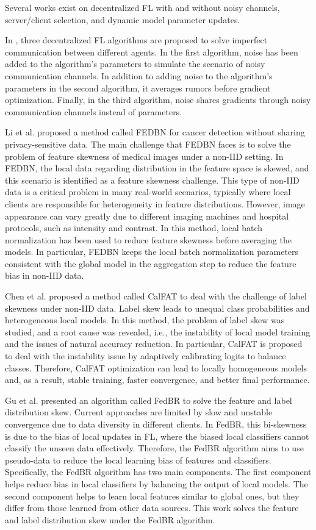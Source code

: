 Several works exist on decentralized FL with and without noisy channels, server/client selection, and dynamic model parameter updates. 

In \citep{ref35}, three decentralized FL algorithms are proposed to solve imperfect communication between different agents. In the first algorithm, noise has been added to the algorithm's parameters to simulate the scenario of noisy communication channels. In addition to adding noise to the algorithm's parameters in the second algorithm, it averages rumors before gradient optimization. Finally, in the third algorithm, noise shares gradients through noisy communication channels instead of parameters. 

Li et al. \citep{ref61} proposed a method called FEDBN for cancer detection without sharing privacy-sensitive data. The main challenge that FEDBN faces is to solve the problem of feature skewness of medical images under a non-IID setting. In FEDBN, the local data regarding distribution in the feature space is skewed, and this scenario is identified as a feature skewness challenge. This type of non-IID data is a critical problem in many real-world scenarios, typically where local clients are responsible for heterogeneity in feature distributions. However, image appearance can vary greatly due to different imaging machines and hospital protocols, such as intensity and contrast. In this method, local batch normalization has been used to reduce feature skewness before averaging the models. In particular, FEDBN keeps the local batch normalization parameters consistent with the global model in the aggregation step to reduce the feature bias in non-IID data.

Chen et al. \citep{ref62} proposed a method called CalFAT to deal with the challenge of label skewness under non-IID data. Label skew leads to unequal class probabilities and heterogeneous local models. In this method, the problem of label skew was studied, and a root cause was revealed, i.e., the instability of local model training and the issues of natural accuracy reduction. In particular, CalFAT is proposed to deal with the instability issue by adaptively calibrating logits to balance classes. Therefore, CalFAT optimization can lead to locally homogeneous models and, as a result, stable training, faster convergence, and better final performance.

Gu et al. \citep{ref63} presented an algorithm called FedBR to solve the feature and label distribution skew. Current approaches are limited by slow and unstable convergence due to data diversity in different clients. In FedBR, this bi-skewness is due to the bias of local updates in FL, where the biased local classifiers cannot classify the unseen data effectively. Therefore, the FedBR algorithm aims to use pseudo-data to reduce the local learning bias of features and classifiers. Specifically, the FedBR algorithm has two main components. The first component helps reduce bias in local classifiers by balancing the output of local models. The second component helps to learn local features similar to global ones, but they differ from those learned from other data sources. This work solves the feature and label distribution skew under the FedBR algorithm.


